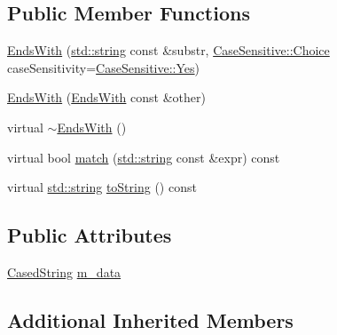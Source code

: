 \subsection*{Public Member Functions}
\begin{DoxyCompactItemize}
\item 
\hyperlink{struct_catch_1_1_matchers_1_1_impl_1_1_std_string_1_1_ends_with_ae90c02ff06c9dd5e62218b2b521e8cab}{Ends\+With} (\hyperlink{_s_d_l__opengl__glext_8h_ae84541b4f3d8e1ea24ec0f466a8c568b}{std\+::string} const \&substr, \hyperlink{struct_catch_1_1_case_sensitive_aad49d3aee2d97066642fffa919685c6a}{Case\+Sensitive\+::\+Choice} case\+Sensitivity=\hyperlink{struct_catch_1_1_case_sensitive_aad49d3aee2d97066642fffa919685c6aa7c5550b69ec3c502e6f609b67f9613c6}{Case\+Sensitive\+::\+Yes})
\item 
\hyperlink{struct_catch_1_1_matchers_1_1_impl_1_1_std_string_1_1_ends_with_a9321aac07fb17613a7993e99003b3be2}{Ends\+With} (\hyperlink{struct_catch_1_1_matchers_1_1_impl_1_1_std_string_1_1_ends_with}{Ends\+With} const \&other)
\item 
virtual \hyperlink{struct_catch_1_1_matchers_1_1_impl_1_1_std_string_1_1_ends_with_af0aa8f2d638efd9f9ab9490a2faa3201}{$\sim$\+Ends\+With} ()
\item 
virtual bool \hyperlink{struct_catch_1_1_matchers_1_1_impl_1_1_std_string_1_1_ends_with_ad0e03d7f54ffa5859f84faebccf11e76}{match} (\hyperlink{_s_d_l__opengl__glext_8h_ae84541b4f3d8e1ea24ec0f466a8c568b}{std\+::string} const \&expr) const 
\item 
virtual \hyperlink{_s_d_l__opengl__glext_8h_ae84541b4f3d8e1ea24ec0f466a8c568b}{std\+::string} \hyperlink{struct_catch_1_1_matchers_1_1_impl_1_1_std_string_1_1_ends_with_a54715c94c215a1fc5fb6336acf52eb06}{to\+String} () const 
\end{DoxyCompactItemize}
\subsection*{Public Attributes}
\begin{DoxyCompactItemize}
\item 
\hyperlink{struct_catch_1_1_matchers_1_1_impl_1_1_std_string_1_1_cased_string}{Cased\+String} \hyperlink{struct_catch_1_1_matchers_1_1_impl_1_1_std_string_1_1_ends_with_a344d8433f3ba3e0de301ab16ed6dd746}{m\+\_\+data}
\end{DoxyCompactItemize}
\subsection*{Additional Inherited Members}


